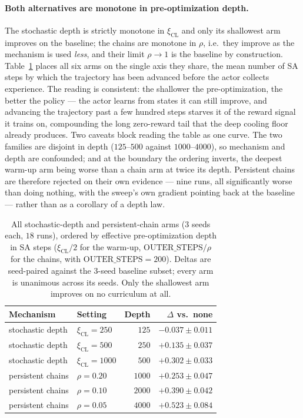 \documentclass[letterpaper]{article} %
\begin{document}
\paragraph{Both alternatives are monotone in pre-optimization depth.}
The stochastic depth is strictly monotone in $\xi_{\mathrm{CL}}$ and only its shallowest arm improves on the baseline; the chains are monotone in $\rho$, i.e.\ they improve as the mechanism is used \emph{less}, and their limit $\rho \to 1$ is the baseline by construction. Table~\ref{tab:cldepth} places all six arms on the single axis they share, the mean number of SA steps by which the trajectory has been advanced before the actor collects experience. The reading is consistent: the shallower the pre-optimization, the better the policy --- the actor learns from states it can still improve, and advancing the trajectory past a few hundred steps starves it of the reward signal it trains on, compounding the long zero-reward tail that the deep cooling floor already produces. Two caveats block reading the table as one curve. The two families are disjoint in depth ($125$--$500$ against $1000$--$4000$), so mechanism and depth are confounded; and at the boundary the ordering inverts, the deepest warm-up arm being worse than a chain arm at twice its depth. Persistent chains are therefore rejected on their own evidence --- nine runs, all significantly worse than doing nothing, with the sweep's own gradient pointing back at the baseline --- rather than as a corollary of a depth law.

\begin{table}[t]
\centering
\small
\begin{tabular}{llrr}
\toprule
\textbf{Mechanism} & \textbf{Setting} & \textbf{Depth} & \textbf{$\Delta$ vs.\ none} \\
\midrule
stochastic depth & $\xi_{\mathrm{CL}} = 250$  & $125$  & $-0.037 \pm 0.011$ \\
stochastic depth & $\xi_{\mathrm{CL}} = 500$  & $250$  & $+0.135 \pm 0.037$ \\
stochastic depth & $\xi_{\mathrm{CL}} = 1000$ & $500$  & $+0.302 \pm 0.033$ \\
persistent chains & $\rho = 0.20$ & $1000$ & $+0.253 \pm 0.047$ \\
persistent chains & $\rho = 0.10$ & $2000$ & $+0.390 \pm 0.042$ \\
persistent chains & $\rho = 0.05$ & $4000$ & $+0.523 \pm 0.084$ \\
\bottomrule
\end{tabular}
\caption{All stochastic-depth and persistent-chain arms ($3$ seeds each, $18$ runs), ordered by effective pre-optimization depth in SA steps ($\xi_{\mathrm{CL}}/2$ for the warm-up, $\mathrm{OUTER\_STEPS}/\rho$ for the chains, with $\mathrm{OUTER\_STEPS} = 200$). Deltas are seed-paired against the $3$-seed baseline subset; every arm is unanimous across its seeds. Only the shallowest arm improves on no curriculum at all.}
\label{tab:cldepth}
\end{table}
\end{document}
